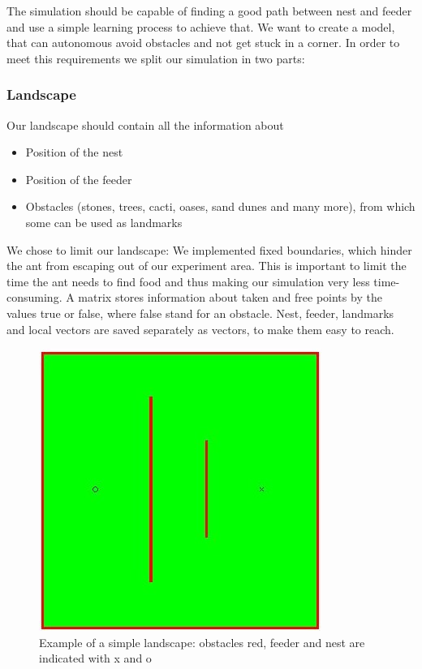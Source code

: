 \documentclass[11pt]{article}
\begin{document}
The simulation should be capable of finding a good path between nest and feeder and use a simple learning process to achieve that. We want to create a model, that can autonomous avoid obstacles and not get stuck in a corner. In order to meet this requirements we split our simulation in two parts:

\subsubsection*{Landscape}
Our landscape should contain all the information about
\begin{itemize}

\item Position of the nest
\item Position of the feeder
\item Obstacles (stones, trees, cacti, oases, sand dunes and many more), from which some can be used as landmarks
\end{itemize}

We chose to limit our landscape: We implemented fixed boundaries, which hinder the ant from escaping out of our experiment area. This is important to limit the time the ant needs to find food and thus making our simulation very less time-consuming. A matrix stores information about taken and free points by the values true or false, where false stand for an obstacle. Nest, feeder, landmarks and local vectors are saved separately as vectors, to make them easy to reach.
\begin{figure}[h!]
	\centering
 	\includegraphics[scale=0.6]{images/landscape.jpg}
 	\caption{Example of a simple landscape: obstacles red, feeder and nest are indicated with x and o}
\end{figure}
\end{document}
